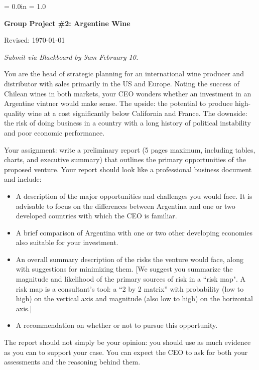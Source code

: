 \documentclass[letterpaper,12pt]{article}
\def\HeadName{Group Project \#2}
\begin{document}
\parindent = 0.0in
\parskip = 1.0\bigskipamount
\thispagestyle{empty}%
\Head

\centerline{\large \bf \HeadName:  Argentine Wine}%
\centerline{Revised:  \today}

\medskip
{\it Submit via Blackboard by 9am February 10.}
\medskip

You are the head of strategic planning for an international wine producer and distributor
with sales primarily in the US and Europe.
Noting the success of Chilean wines in both markets,
your CEO wonders whether an investment in an Argentine vintner would make sense.
The upside:  the potential to produce high-quality wine at a cost
significantly below California and France.
The downside:  the risk of doing business in a country
with a long history of political instability and 
poor economic performance.


Your assignment:  write a preliminary report (5 pages maximum,
including tables, charts, and executive summary) that outlines the primary opportunities of the proposed venture.  
Your report should look like a professional business document 
and include:  
%
\begin{itemize}%

\item A description of the major opportunities and challenges
you would face.  It is advisable to focus on the differences between
Argentina and one or two developed countries with which the CEO is familiar.

\item A brief comparison of Argentina with one or two other developing
economies also suitable for your investment.

\item An overall summary description of the risks the venture would
face, along with suggestions for minimizing them. 
[We suggest you summarize the magnitude and likelihood of the primary
sources of risk in a ``risk map".  A risk map is a consultant's tool:
a ``2 by 2 matrix'' with probability (low to high) on the
vertical axis and magnitude (also low to high) on the horizontal
axis.] 

\item A recommendation on whether or not to pursue this opportunity.  

\end{itemize}
%
The report should not simply be your opinion:  you should 
use as much evidence as you can to support your case.  
You can expect the CEO to ask for both your 
assessments and the reasoning behind them.  
\end{document}
